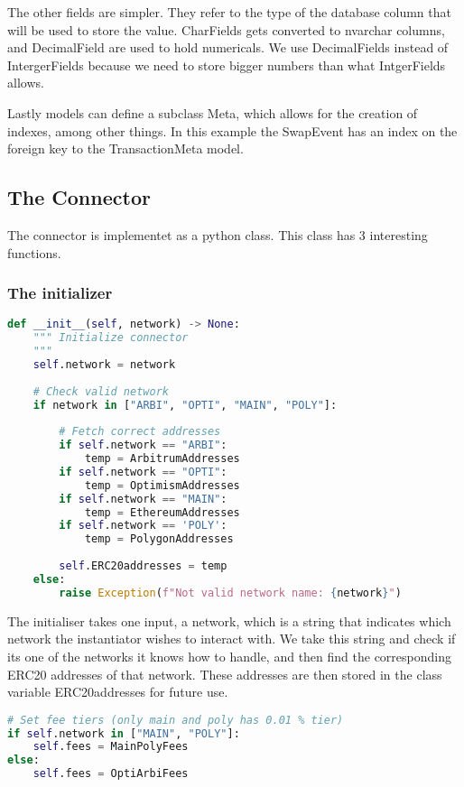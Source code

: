 The other fields are simpler. They refer to the type of the database column that will be used to store the value. CharFields gets converted to nvarchar columns, and DecimalField are used to hold numericals. We use DecimalFields instead of IntergerFields because we need to store bigger numbers than what IntgerFields allows. 

Lastly models can define a subclass Meta, which allows for the creation of indexes, among other things. In this example the SwapEvent has an index on the foreign key to the TransactionMeta model. 


\subsection{The Connector}

The connector is implementet as a python class. This class has 3 interesting functions.

\subsubsection{The initializer}
\begin{lstlisting}[language=python]
def __init__(self, network) -> None:
    """ Initialize connector
    """
    self.network = network
    
    # Check valid network
    if network in ["ARBI", "OPTI", "MAIN", "POLY"]:
        
        # Fetch correct addresses
        if self.network == "ARBI":
            temp = ArbitrumAddresses
        if self.network == "OPTI":
            temp = OptimismAddresses
        if self.network == "MAIN":
            temp = EthereumAddresses
        if self.network == 'POLY':
            temp = PolygonAddresses
        
        self.ERC20addresses = temp
    else:
        raise Exception(f"Not valid network name: {network}")
\end{lstlisting}

The initialiser takes one input, a network, which is a string that indicates which network the instantiator wishes to interact with. We take this string and check if its one of the networks it knows how to handle, and then find the corresponding ERC20 addresses of that network. These addresses are then stored in the class variable ERC20addresses for future use.

\begin{lstlisting}[language=python]
# Set fee tiers (only main and poly has 0.01 % tier)
if self.network in ["MAIN", "POLY"]:
    self.fees = MainPolyFees
else:
    self.fees = OptiArbiFees
\end{lstlisting}
        
